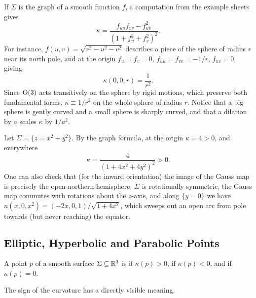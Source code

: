 \documentclass[a4paper]{scrartcl}
\begin{document}
\begin{example}\label{ex:graphcurvature}
    If $\Sigma$ is the graph of a smooth function $f$, a computation from the example sheets gives
    $$
    \kappa = \frac{f_{uu} f_{vv} - f_{uv}^2}{(1 + f_u^2 + f_v^2)^2}.
    $$
    For instance, $f(u, v) = \sqrt{r^2 - u^2 - v^2}$ describes a piece of the sphere of radius $r$ near its north pole, and at the origin $f_u = f_v = 0$, $f_{uu} = f_{vv} = -1/r$, $f_{uv} = 0$, giving
    $$
    \kappa(0, 0, r) = \frac{1}{r^2}.
    $$
    Since $\operatorname{O}(3)$ acts transitively on the sphere by rigid motions, which preserve both fundamental forms, $\kappa \equiv 1/r^2$ on the whole sphere of radius $r$. Notice that a big sphere is gently curved and a small sphere is sharply curved, and that a dilation by $a$ scales $\kappa$ by $1/a^2$.
\end{example}

\begin{example}
    Let $\Sigma = \{z = x^2 + y^2\}$. By the graph formula, at the origin $\kappa = 4 > 0$, and everywhere
    $$
    \kappa = \frac{4}{(1 + 4x^2 + 4y^2)^2} > 0.
    $$
    One can also check that (for the inward orientation) the image of the Gauss map is precisely the open northern hemisphere: $\Sigma$ is rotationally symmetric, the Gauss map commutes with rotations about the $z$-axis, and along $\{y = 0\}$ we have $n(x, 0, x^2) = (-2x, 0, 1)/\sqrt{1 + 4x^2}$, which sweeps out an open arc from pole towards (but never reaching) the equator.
\end{example}

\subsection{Elliptic, Hyperbolic and Parabolic Points}

\begin{definition}
    A point $p$ of a smooth surface $\Sigma \subseteq \mathbb{R}^3$ is
     if $\kappa(p) > 0$,  if $\kappa(p) < 0$, and  if $\kappa(p) = 0$.
\end{definition}

The sign of the curvature has a directly visible meaning.
\end{document}
